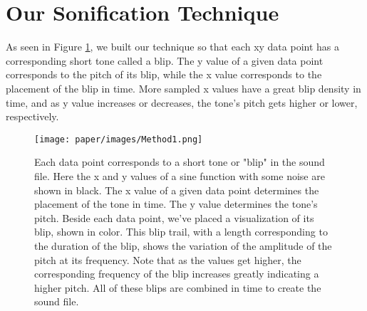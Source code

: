 \documentclass[]{acmsiggraph}
\begin{document}


\section{Our Sonification Technique}

As seen in Figure \ref{fig:method}, we built our technique so that each xy data point has a corresponding short tone called a blip. The y value of a given data point corresponds to the pitch of its blip, while the x value corresponds to the placement of the blip in time. More sampled x values have a great blip density in time, and as y value increases or decreases, the tone’s pitch gets higher or lower, respectively.

\begin{figure}
\centering
\texttt{[image: paper/images/Method1.png]}
\caption{Each data point corresponds to a short tone or "blip" in the sound file. Here the x and y values of a sine function with some noise are shown in black. The x value of a given data point determines the placement of the tone in time. The y value determines the tone’s pitch. Beside each data point, we've placed a visualization of its blip, shown in color. This blip trail, with a length corresponding to the duration of the blip, shows the variation of the amplitude of the pitch at its frequency. Note that as the values get higher, the corresponding frequency of the blip increases greatly indicating a higher pitch. All of these blips are combined in time to create the sound file.}
\label{fig:method} 
\end{figure}
\end{document}

